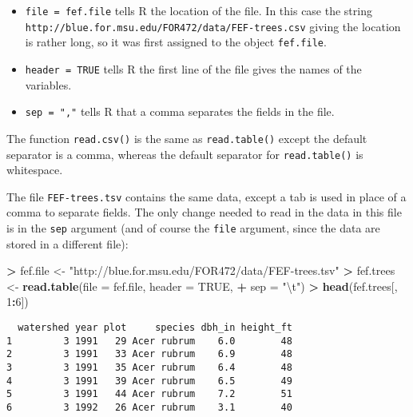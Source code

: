 \documentclass[]{krantz}
\makeatletter
\newenvironment{Shaded}{\begin{snugshade}}{\end{snugshade}}
\newcommand{\KeywordTok}[1]{\textcolor[rgb]{0.27,0.27,0.27}{\textbf{#1}}}
\newcommand{\DataTypeTok}[1]{\textcolor[rgb]{0.27,0.27,0.27}{#1}}
\newcommand{\DecValTok}[1]{\textcolor[rgb]{0.06,0.06,0.06}{#1}}
\newcommand{\CharTok}[1]{\textcolor[rgb]{0.5,0.5,0.5}{#1}}
\newcommand{\StringTok}[1]{\textcolor[rgb]{0.5,0.5,0.5}{#1}}
\newcommand{\OtherTok}[1]{\textcolor[rgb]{0.37,0.37,0.37}{#1}}
\newcommand{\OperatorTok}[1]{\textcolor[rgb]{0.43,0.43,0.43}{\textbf{#1}}}
\newcommand{\NormalTok}[1]{#1}
\providecommand{\tightlist}{%
  \setlength{\itemsep}{0pt}\setlength{\parskip}{0pt}}
\newenvironment{kframe}{%
\medskip{}
\setlength{\fboxsep}{.8em}
 \def\at@end@of@kframe{}%
 \ifinner\ifhmode%
  \def\at@end@of@kframe{\end{minipage}}%
  \begin{minipage}{\columnwidth}%
 \fi\fi%
 \def\FrameCommand##1{\hskip\@totalleftmargin \hskip-\fboxsep
 \colorbox{shadecolor}{##1}\hskip-\fboxsep
     \hskip-\linewidth \hskip-\@totalleftmargin \hskip\columnwidth}%
 \MakeFramed {\advance\hsize-\width
   \@totalleftmargin\z@ \linewidth\hsize
   \@setminipage}}%
 {\par\unskip\endMakeFramed%
 \at@end@of@kframe}
\renewenvironment{Shaded}{\begin{kframe}}{\end{kframe}}
\theoremstyle{definition}
\theoremstyle{definition}
\theoremstyle{definition}
\theoremstyle{remark}
\makeatother
\begin{document}
\begin{itemize}
\tightlist
\item
  \texttt{file\ =\ fef.file} tells R the location of the file. In this
  case the string
  \texttt{http://blue.for.msu.edu/FOR472/data/FEF-trees.csv} giving the
  location is rather long, so it was first assigned to the object
  \texttt{fef.file}.
\item
  \texttt{header\ =\ TRUE} tells R the first line of the file gives the
  names of the variables.
\item
  \texttt{sep\ =\ ","} tells R that a comma separates the fields in the
  file.
\end{itemize}

The function \texttt{read.csv()} is the same as \texttt{read.table()}
except the default separator is a comma, whereas the default separator
for \texttt{read.table()} is whitespace.

The file \texttt{FEF-trees.tsv} contains the same data, except a tab is
used in place of a comma to separate fields. The only change needed to
read in the data in this file is in the \texttt{sep} argument (and of
course the \texttt{file} argument, since the data are stored in a
different file):

\begin{Shaded}
\begin{Highlighting}[]
\OperatorTok{>}\StringTok{ }\NormalTok{fef.file <-}\StringTok{ "http://blue.for.msu.edu/FOR472/data/FEF-trees.tsv"}
\OperatorTok{>}\StringTok{ }\NormalTok{fef.trees <-}\StringTok{ }\KeywordTok{read.table}\NormalTok{(}\DataTypeTok{file =}\NormalTok{ fef.file, }\DataTypeTok{header =} \OtherTok{TRUE}\NormalTok{, }
\OperatorTok{+}\StringTok{   }\DataTypeTok{sep =} \StringTok{"}\CharTok{\textbackslash{}t}\StringTok{"}\NormalTok{)}
\OperatorTok{>}\StringTok{ }\KeywordTok{head}\NormalTok{(fef.trees[, }\DecValTok{1}\OperatorTok{:}\DecValTok{6}\NormalTok{])}
\end{Highlighting}
\end{Shaded}

\begin{verbatim}
  watershed year plot     species dbh_in height_ft
1         3 1991   29 Acer rubrum    6.0        48
2         3 1991   33 Acer rubrum    6.9        48
3         3 1991   35 Acer rubrum    6.4        48
4         3 1991   39 Acer rubrum    6.5        49
5         3 1991   44 Acer rubrum    7.2        51
6         3 1992   26 Acer rubrum    3.1        40
\end{verbatim}
\end{document}
